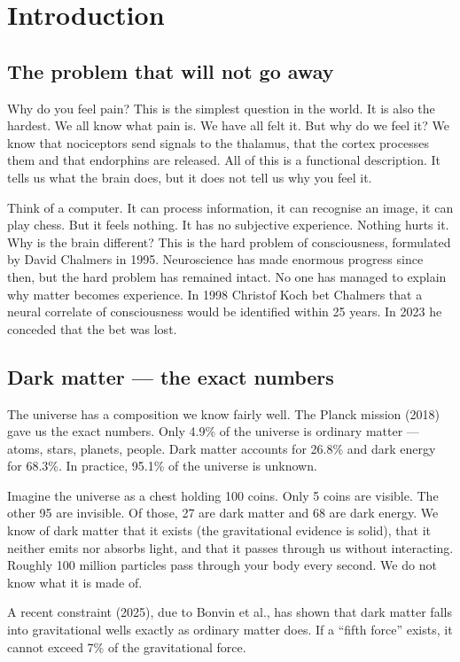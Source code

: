 \section{Introduction}

\subsection{The problem that will not go away}
Why do you feel pain? This is the simplest question in the world. It is also the hardest. We all know what pain is. We have all felt it. But why do we feel it? We know that nociceptors send signals to the thalamus, that the cortex processes them and that endorphins are released. All of this is a functional description. It tells us what the brain does, but it does not tell us why you feel it.

Think of a computer. It can process information, it can recognise an image, it can play chess. But it feels nothing. It has no subjective experience. Nothing hurts it. Why is the brain different? This is the hard problem of consciousness, formulated by David Chalmers in 1995. Neuroscience has made enormous progress since then, but the hard problem has remained intact. No one has managed to explain why matter becomes experience. In 1998 Christof Koch bet Chalmers that a neural correlate of consciousness would be identified within 25 years. In 2023 he conceded that the bet was lost.

\subsection{Dark matter --- the exact numbers}
The universe has a composition we know fairly well. The Planck mission (2018) gave us the exact numbers. Only 4.9\% of the universe is ordinary matter --- atoms, stars, planets, people. Dark matter accounts for 26.8\% and dark energy for 68.3\%. In practice, 95.1\% of the universe is unknown.

Imagine the universe as a chest holding 100 coins. Only 5 coins are visible. The other 95 are invisible. Of those, 27 are dark matter and 68 are dark energy. We know of dark matter that it exists (the gravitational evidence is solid), that it neither emits nor absorbs light, and that it passes through us without interacting. Roughly 100 million particles pass through your body every second. We do not know what it is made of.

A recent constraint (2025), due to Bonvin et al., has shown that dark matter falls into gravitational wells exactly as ordinary matter does. If a ``fifth force'' exists, it cannot exceed 7\% of the gravitational force.

